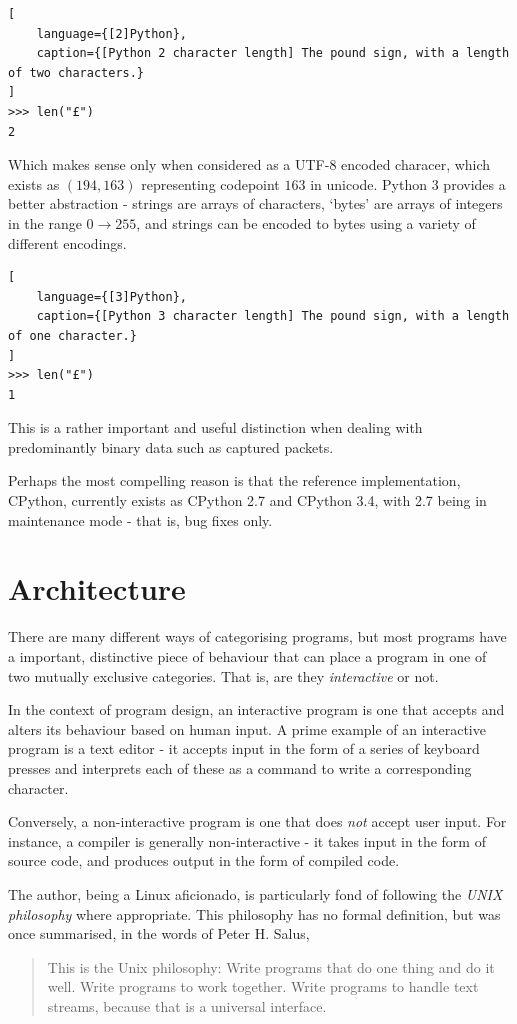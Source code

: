 \documentclass[10pt,a4paper,notitlepage]{report}
\begin{document}
\begin{lstlisting}[
    language={[2]Python},
    caption={[Python 2 character length] The pound sign, with a length of two characters.}
]
>>> len("£")
2
\end{lstlisting}

Which makes sense only when considered as a UTF-8 encoded characer, which exists as $(194, 163)$ representing codepoint $163$ in unicode.
Python 3 provides a better abstraction - strings are arrays of characters, `bytes' are arrays of integers in the range $0 \rightarrow 255$, and strings can be encoded to bytes using a variety of different encodings.

\begin{lstlisting}[
    language={[3]Python},
    caption={[Python 3 character length] The pound sign, with a length of one character.}
]
>>> len("£")
1
\end{lstlisting}

This is a rather important and useful distinction when dealing with predominantly binary data such as captured packets.

Perhaps the most compelling reason is that the reference implementation, CPython, currently exists as CPython 2.7 and CPython 3.4, with 2.7 being in maintenance mode\cite{cpy2maint} - that is, bug fixes only.

\section{Architecture}
There are many different ways of categorising programs, but most programs have a important, distinctive piece of behaviour that can place a program in one of two mutually exclusive categories. That is, are they \emph{interactive} or not.

In the context of program design, an interactive program is one that accepts and alters its behaviour based on human input.
A prime example of an interactive program is a text editor - it accepts input in the form of a series of keyboard presses and interprets each of these as a command to write a corresponding character.

Conversely, a non-interactive program is one that does \emph{not} accept user input. For instance, a compiler is generally non-interactive - it takes input in the form of source code, and produces output in the form of compiled code.

The author, being a Linux aficionado, is particularly fond of following the \emph{UNIX philosophy} where appropriate. This philosophy has no formal definition, but was once summarised, in the words of Peter H. Salus\cite{qcou},
\begin{quote}
This is the Unix philosophy: Write programs that do one thing and do it well. Write programs to work together. Write programs to handle text streams, because that is a universal interface.
\end{quote}
\end{document}
